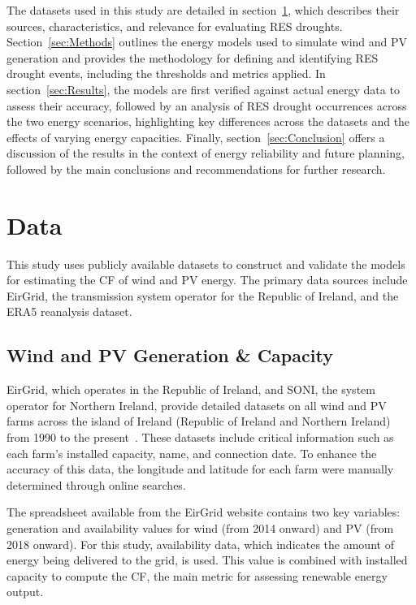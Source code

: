 \documentclass[a4paper, 11pt]{article}
\begin{document}
The datasets used in this study are detailed in section~\ref{sec:Data}, which describes their sources, characteristics, and relevance for evaluating RES droughts. Section~\ref{sec:Methods} outlines the energy models used to simulate wind and PV generation and provides the methodology for defining and identifying RES drought events, including the thresholds and metrics applied. In section~\ref{sec:Results}, the models are first verified against actual energy data to assess their accuracy, followed by an analysis of RES drought occurrences across the two energy scenarios, highlighting key differences across the datasets and the effects of varying energy capacities. Finally, section~\ref{sec:Conclusion} offers a discussion of the results in the context of energy reliability and future planning, followed by the main conclusions and recommendations for further research.

\section{Data}
\label{sec:Data}

This study uses publicly available datasets to construct and validate the models for estimating the CF of wind and PV energy. The primary data sources include EirGrid, the transmission system operator for the Republic of Ireland, and the ERA5 reanalysis dataset.

\subsection{Wind and PV Generation \& Capacity}
\label{sec:eirgrid}

EirGrid, which operates in the Republic of Ireland, and SONI, the system operator for Northern Ireland, provide detailed datasets on all wind and PV farms across the island of Ireland (Republic of Ireland and Northern Ireland) from 1990 to the present~\cite{eirgrid}. These datasets include critical information such as each farm’s installed capacity, name, and connection date. To enhance the accuracy of this data, the longitude and latitude for each farm were manually determined through online searches.

The spreadsheet available from the EirGrid website contains two key variables: generation and availability values for wind (from 2014 onward) and PV (from 2018 onward). For this study, availability data, which indicates the amount of energy being delivered to the grid, is used. This value is combined with installed capacity to compute the CF, the main metric for assessing renewable energy output.
\end{document}
